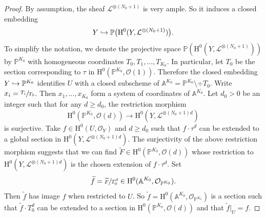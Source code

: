 \documentclass[JEP,XML,SOM,Unicode,published]{cedram}
\newcommand\hto{\mathrel{\lhook\joinrel\to}}
\theoremstyle{plain}
\theoremstyle{definition}
\newcommand{\ho}{\mathrm{H}}
\newcommand{\li}{\mathcal{L}}
\newcommand{\A}{\mathbb{A}}
\newcommand{\pr}{\mathbb{P}}
\begin{document}
\begin{proof}[Proof]
By assumption, the sheaf $\li^{\otimes (N_0+1)}$ is very ample. So it induces a closed embedding\vspace*{-3pt}
\[
Y\hto \pr\bigl(\ho^0(Y, \li^{\otimes (N_0+1)}) \bigr).
\]
To simplify the notation, we denote the projective space $\pr\left(\ho^0(Y, \li^{\otimes (N_0+1)})\right)$ by $\pr^{K_0}$ with homogeneous coordinates $T_0,T_1,\dots, T_{K_0}$. In particular, let $T_0$ be the section corresponding to $\tau$ in $\ho^0(\pr^{K_0},\mathcal{O}(1))$. Therefore the closed embedding $Y\hto \pr^{K_0}$ identifies $U$ with a closed subscheme of $\A^{K_0}=\pr^{K_0}\setminus\div T_0$. Write $x_i=\sfrac{T_i}{T_0}$. Then $x_1,\dots, x_{K_0}$ form a system of coordinates of $\A^{K_0}$. Let $d_0>0$ be an integer such that for any $d\geq d_0$, the restriction morphism
\[
\ho^0(\pr^{K_0},\mathcal{O}(d)) \to \ho^0(Y, \li^{\otimes (N_0+1)d})
\]
is surjective. Take $f\in \ho^0(U, \mathcal{O}_Y)$ and $d\geq d_0$ such that $f\cdot \tau^d$ can be extended to a global section in $ \ho^0(Y, \li^{\otimes (N_0+1)d})$. The surjectivity of the above restriction morphism suggests that we can find $\widetilde{F} \in\ho^0(\pr^{K_0},\mathcal{O}(d))$ whose restriction to $\ho^0(Y, \li^{\otimes (N_0+1)d})$ is the chosen extension of $f\cdot \tau^d$. Set\vspace*{-3pt}
\[
\widetilde{f}= \sfrac{\widetilde{F}}{T_0^d}\in \ho^0(\A^{K_0},\mathcal{O}_{\pr^{K_0}}).
\]
Then $\widetilde{f}$ has image $f$ when restricted to $U$. So $\widetilde{f}= \ho^0(\A^{K_0},\mathcal{O}_{\pr^{K_0}})$ is a section such that $\widetilde{f}\cdot T_0^d$ can be extended to a section in $\ho^0(\pr^{K_0},\mathcal{O}(d))$ and that $\widetilde{f}|_U=f$.


\end{proof}
\end{document}
